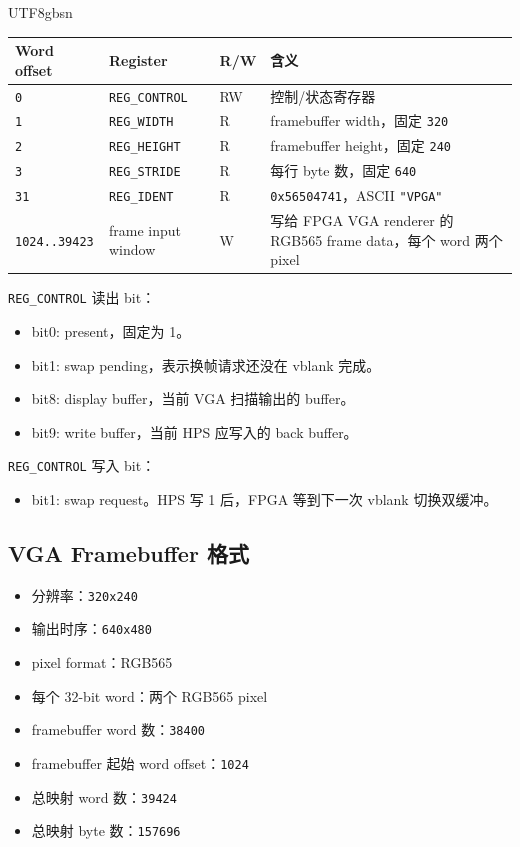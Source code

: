 \documentclass[12pt,a4paper]{article}
\begin{document}
\begin{CJK*}{UTF8}{gbsn}
\begin{longtable}{>{\raggedright\arraybackslash}p{} >{\raggedright\arraybackslash}p{} >{\raggedright\arraybackslash}p{} >{\raggedright\arraybackslash}p{}}
\toprule
Word offset & Register & R/W & 含义 \\
\midrule
\endhead
\texttt{0} & \texttt{REG\_CONTROL} & RW & 控制/状态寄存器 \\
\texttt{1} & \texttt{REG\_WIDTH} & R & framebuffer width，固定 \texttt{320} \\
\texttt{2} & \texttt{REG\_HEIGHT} & R & framebuffer height，固定 \texttt{240} \\
\texttt{3} & \texttt{REG\_STRIDE} & R & 每行 byte 数，固定 \texttt{640} \\
\texttt{31} & \texttt{REG\_IDENT} & R & \texttt{0x56504741}，ASCII \texttt{"VPGA"} \\
\texttt{1024..39423} & frame input window & W & 写给 FPGA VGA renderer 的 RGB565 frame data，每个 word 两个 pixel \\
\bottomrule
\end{longtable}

\texttt{REG\_CONTROL} 读出 bit：

\begin{itemize}
  \item bit0: present，固定为 1。
  \item bit1: swap pending，表示换帧请求还没在 vblank 完成。
  \item bit8: display buffer，当前 VGA 扫描输出的 buffer。
  \item bit9: write buffer，当前 HPS 应写入的 back buffer。
\end{itemize}

\texttt{REG\_CONTROL} 写入 bit：

\begin{itemize}
  \item bit1: swap request。HPS 写 1 后，FPGA 等到下一次 vblank 切换双缓冲。
\end{itemize}

\subsection{VGA Framebuffer 格式}

\begin{itemize}
  \item 分辨率：\texttt{320x240}
  \item 输出时序：\texttt{640x480}
  \item pixel format：RGB565
  \item 每个 32-bit word：两个 RGB565 pixel
  \item framebuffer word 数：\texttt{38400}
  \item framebuffer 起始 word offset：\texttt{1024}
  \item 总映射 word 数：\texttt{39424}
  \item 总映射 byte 数：\texttt{157696}
\end{itemize}


\end{CJK*}
\end{document}
